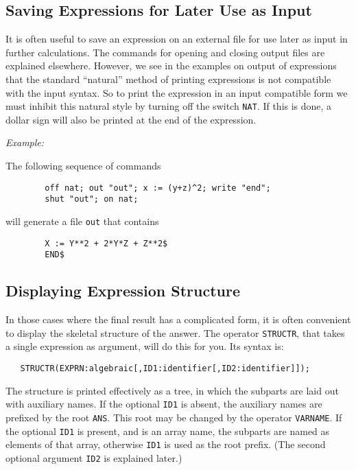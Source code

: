 \subsection{Saving Expressions for Later Use as Input}
\hypertarget{switch:NAT}{}

It is often useful to save an expression on an external file for use later
as input in further calculations. The commands for opening and closing
output files are explained elsewhere. However, we see in the examples on
output of expressions that the standard ``natural'' method of printing
expressions is not compatible with the input syntax. So to print the
expression in an input compatible form we must inhibit this natural style
by turning off the switch {\tt NAT}. If this is done, a
dollar sign will also be printed at the end of the expression.

{\it Example:}

The following sequence of commands
\begin{verbatim}
        off nat; out "out"; x := (y+z)^2; write "end";
        shut "out"; on nat;
\end{verbatim}
will generate a file {\tt out} that contains
\begin{verbatim}
        X := Y**2 + 2*Y*Z + Z**2$
        END$
\end{verbatim}

\subsection{Displaying Expression Structure}
\hypertarget{operator:STRUCTR}{}

In those cases where the final result has a complicated form, it is often
convenient to display the skeletal structure of the answer.  The operator
{\tt STRUCTR}, that takes a single expression as argument,
will do this for you.  Its syntax is:
\begin{verbatim}
   STRUCTR(EXPRN:algebraic[,ID1:identifier[,ID2:identifier]]);
\end{verbatim}
The structure is printed effectively as a tree, in which the subparts are
laid out with auxiliary names.  If the optional {\tt ID1} is absent, the
auxiliary names are prefixed by the root {\tt ANS}.  This root may be
changed by the operator {\tt VARNAME}.  If the
optional {\tt ID1} is present, and is an array name, the subparts are
named as elements of that array, otherwise {\tt ID1} is used as the root
prefix. (The second optional argument {\tt ID2} is explained later.)

